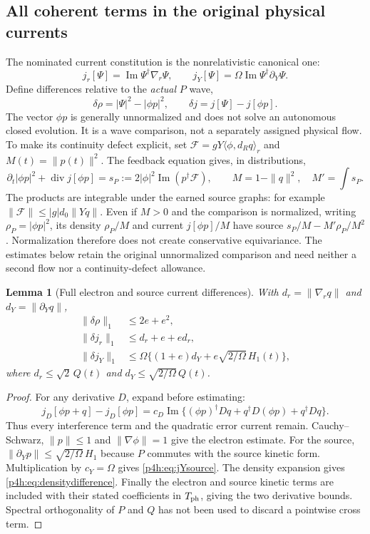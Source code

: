 \documentclass[11pt]{article}
\numberwithin{equation}{section}
\newtheorem{lemma}[theorem]{Lemma}
\theoremstyle{definition}
\theoremstyle{remark}
\begin{document}
\subsection{All coherent terms in the original physical currents}

The nominated current constitution is the nonrelativistic
canonical one:
\[
 j_r[\Psi]=\operatorname{Im}\Psi^\dagger\nabla_r\Psi,\qquad
 j_Y[\Psi]=\Omega\operatorname{Im}\Psi^\dagger\partial_Y\Psi.
\]
Define differences relative to the \emph{actual} $P$ wave,
\[
 \delta\rho=|\Psi|^2-|\phi p|^2,\qquad
 \delta j=j[\Psi]-j[\phi p].
\]
The vector $\phi p$ is generally unnormalized and does not
solve an autonomous closed evolution. It is a wave
comparison, not a separately assigned physical flow. To make its
continuity defect explicit, set
$\mathcal F=gY\langle\phi,d_Rq\rangle_r$ and $M(t)=\|p(t)\|^2$.
The feedback equation gives, in distributions,
\begin{equation}\label{p4h:eq:comparisondefect}
 \partial_t|\phi p|^2+\operatorname{div}j[\phi p]
 =s_P:=2|\phi|^2\operatorname{Im}(p^\dagger\mathcal F),
 \qquad M=1-\|q\|^2,\quad M'=\int s_P.
\end{equation}
The products are integrable under the earned source graphs: for
example $\|\mathcal F\|\leq |g|d_0\|Yq\|$.
Even if $M>0$ and the comparison is normalized, writing
$\rho_P=|\phi p|^2$, its density $\rho_P/M$ and current $j[\phi p]/M$ have source
$s_P/M-M'\rho_P/M^2$. Normalization therefore does not create
conservative equivariance. The estimates below retain the original
unnormalized comparison and need neither a second flow nor a
continuity-defect allowance.

\begin{lemma}[Full electron and source current differences]
\label{p4h:lem:current}
With $d_r=\|\nabla_rq\|$ and $d_Y=\|\partial_Yq\|$,
\begin{align}
 \|\delta\rho\|_1&\leq2e+e^2,\label{p4h:eq:densitydifference}\\
 \|\delta j_r\|_1&\leq d_r+e+ed_r,\label{p4h:eq:jrelectron}\\
 \|\delta j_Y\|_1
 &\leq\Omega\{(1+e)d_Y+
                     e\sqrt{2/\Omega}\,H_1(t)\},
 \label{p4h:eq:jYsource}
\end{align}
where
$d_r\leq\sqrt2\,Q(t)$ and
$d_Y\leq\sqrt{2/\Omega}\,Q(t)$.
\end{lemma}
\begin{proof}
For any derivative $D$, expand before estimating:
\[
 j_D[\phi p+q]-j_D[\phi p]
 =c_D\operatorname{Im}\{
     (\phi p)^\dagger Dq+q^\dagger D(\phi p)+q^\dagger Dq\}.
\]
Thus every interference term and the quadratic error current
remain. Cauchy--Schwarz, $\|p\|\leq1$ and
$\|\nabla\phi\|=1$ give the electron estimate.
For the source,
$\|\partial_Yp\|\leq\sqrt{2/\Omega}\,H_1$ because $P$
commutes with the source kinetic form. Multiplication by
$c_Y=\Omega$ gives \eqref{p4h:eq:jYsource}.
The density expansion gives \eqref{p4h:eq:densitydifference}.
Finally the electron and source kinetic terms are included
with their stated coefficients in $T_{\rm ph}$, giving the
two derivative bounds. Spectral orthogonality of $P$ and $Q$
has not been used to discard a pointwise cross term.
\end{proof}
\end{document}

